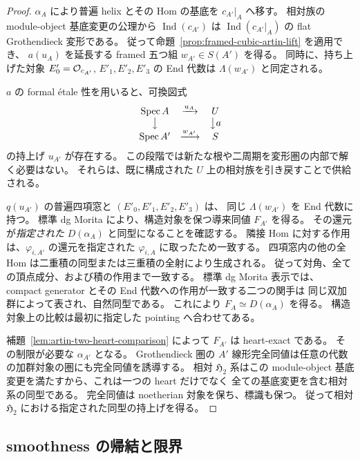 \begin{proof}
$\alpha_A$ により普遍 helix とその Hom の基底を $c_{A'}|_A$ へ移す。
相対族の module-object 基底変更の公理から
$\operatorname{Ind}(c_{A'})$ は $\operatorname{Ind}(c_{A'}|_A)$ の flat Grothendieck 変形である。
従って命題~\ref{prop:framed-cubic-artin-lift} を適用でき、
$a(u_A)$ を延長する framed 五つ組 $w_{A'}\in S(A')$ を得る。
同時に、持ち上げた対象 $E'_0=\mathcal O_{c_{A'}}$, $E'_1,E'_2,E'_3$ の End 代数は
$\Lambda(w_{A'})$ と同定される。

$a$ の formal étale 性を用いると、可換図式
\[
 \begin{matrix}
 \operatorname{Spec} A&\xrightarrow{u_A}&U\\
 \big\downarrow&&\big\downarrow a\\
 \operatorname{Spec} A'&\xrightarrow{w_{A'}}&S
 \end{matrix}
\]
の持上げ $u_{A'}$ が存在する。
この段階では新たな根や二周期を変形圏の内部で解く必要はない。
それらは、既に構成された $U$ 上の相対族を引き戻すことで供給される。

$q(u_{A'})$ の普遍四項窓と $(E'_0,E'_1,E'_2,E'_3)$ は、
同じ $\Lambda(w_{A'})$ を End 代数に持つ。
標準 dg Morita により、構造対象を保つ導来同値 $F_{A'}$ を得る。
その還元が\emph{指定された} $D(\alpha_A)$ と同型になることを確認する。
隣接 Hom に対する作用は、$\varphi_{i,A'}$ の還元を指定された $\varphi_{i,A}$ に取ったため一致する。
四項窓内の他の全 Hom は二重積の同型または三重積の全射により生成される。
従って対角、全ての頂点成分、および積の作用まで一致する。
標準 dg Morita 表示では、compact generator とその End 代数への作用が一致する二つの関手は
同じ双加群によって表され、自然同型である。
これにより $F_A\simeq D(\alpha_A)$ を得る。
構造対象上の比較は最初に指定した pointing へ合わせてある。

補題~\ref{lem:artin-two-heart-comparison} によって $F_{A'}$ は heart-exact である。
その制限が必要な $\alpha_{A'}$ となる。
Grothendieck 圏の $A'$ 線形完全同値は任意の代数の加群対象の圏にも完全同値を誘導する。
相対 $\mathfrak H_2$ 系はこの module-object 基底変更を満たすから、これは一つの heart だけでなく
全ての基底変更を含む相対系の同型である。
完全同値は noetherian 対象を保ち、標識も保つ。
従って相対 $\mathfrak H_2$ における指定された同型の持上げを得る。
\end{proof}

\subsection{smoothness の帰結と限界}

